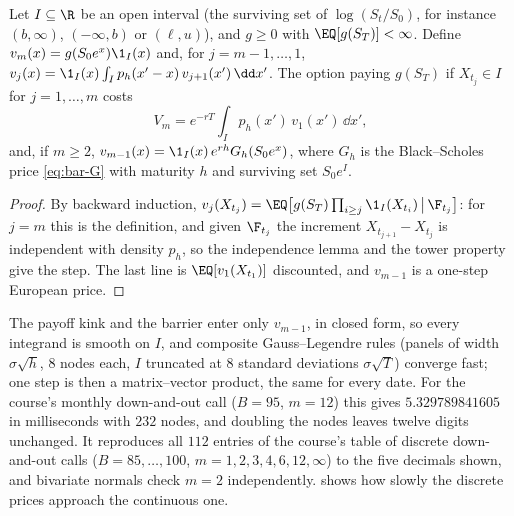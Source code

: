 \begin{proposition}\label{prop:bar-discrete}
Let $I\subseteq\R$ be an open interval (the surviving set of $\log(S_t/S_0)$, for instance $(b,\infty)$,
$(-\infty,b)$ or $(\ell,u)$), and $g\ge0$ with $\EQ[g(S_T)]<\infty$. Define
$v_{m}(x)=g(S_0e^x)\1_I(x)$ and, for $j=m-1,\dots,1$,
$v_j(x)=\1_I(x)\int_Ip_h(x'-x)\,v_{j+1}(x')\,\dd x'$. The option paying $g(S_T)$ if
$X_{t_j}\in I$ for $j=1,\dots,m$ costs
\[
  V_m=e^{-rT}\int_Ip_h(x')\,v_1(x')\,\dd x' ,
\]
and, if $m\ge2$, $v_{m-1}(x)=\1_I(x)\,e^{rh}G_h(S_0e^x)$, where $G_h$ is the Black--Scholes price
\eqref{eq:bar-G} with maturity $h$ and surviving set $S_0e^I$.
\end{proposition}

\begin{proof}
By backward induction, $v_j(X_{t_j})=\EQ\big[g(S_T)\prod_{i\ge j}\1_I(X_{t_i})\,\big|\,\F_{t_j}\big]$:
for $j=m$ this is the definition, and given $\F_{t_j}$ the increment $X_{t_{j+1}}-X_{t_j}$ is
independent with density $p_h$, so the independence lemma and the tower property give the step.
The last line is $\EQ[v_1(X_{t_1})]$ discounted, and $v_{m-1}$ is a one-step European price.
\end{proof}

The payoff kink and the barrier enter only $v_{m-1}$, in closed form, so every integrand is
smooth on $I$, and composite Gauss--Legendre rules (panels of width $\sigma\sqrt h$, $8$ nodes each,
$I$ truncated at $8$ standard deviations $\sigma\sqrt T$) converge fast; one step is then a
matrix--vector product, the same for every date. For the course's monthly down-and-out call
($B=95$, $m=12$) this gives $5.329789841605$ in milliseconds with $232$ nodes, and doubling the
nodes leaves twelve digits unchanged. It reproduces all $112$ entries of the course's table of
discrete down-and-out calls ($B=85,\dots,100$, $m=1,2,3,4,6,12,\infty$) to the five decimals
shown, and bivariate normals check $m=2$ independently.  shows how slowly
the discrete prices approach the continuous one.

